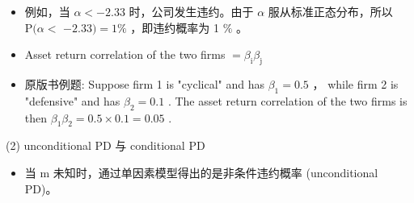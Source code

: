 \begin{itemize}
\item 例如，当 \(\alpha  <  - {2.33}\) 时，公司发生违约。由于 \(\alpha\) 服从标准正态分布，所以 \(\mathrm{P}(\alpha  <\)  \(- {2.33}) = 1\%\) ，即违约概率为 1 \(\%\) 。
\end{itemize}

\begin{itemize}
\item Asset return correlation of the two firms \(= {\beta }_{\mathrm{i}}{\beta }_{\mathrm{j}}\)
\end{itemize}

\begin{itemize}
\item 原版书例题: Suppose firm 1 is "cyclical" and has \({\beta }_{1} = {0.5}\) ， while firm 2 is "defensive" and has \({\beta }_{2} = {0.1}\) . The asset return correlation of the two firms is then \({\beta }_{1}{\beta }_{2} = {0.5} \times  {0.1} = {0.05}\) .
\end{itemize}

(2) unconditional PD 与 conditional PD

\begin{itemize}
\item 当 \(\mathrm{m}\) 未知时，通过单因素模型得出的是非条件违约概率 (unconditional PD)。
\end{itemize}

